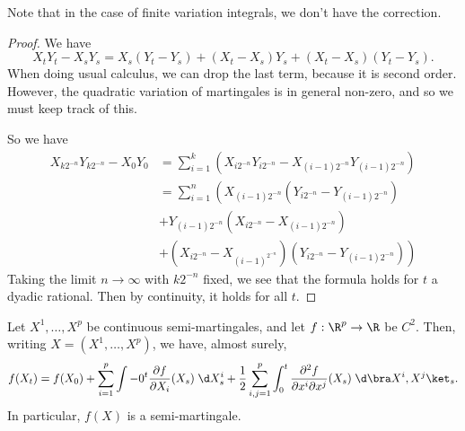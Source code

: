 \documentclass[a4paper]{article}
\begin{document}
Note that in the case of finite variation integrals, we don't have the correction.
\begin{proof}
  We have
  \[
    X_t Y_t - X_s Y_s = X_s (Y_t - Y_s) + (X_t - X_s) Y_s + (X_t - X_s)(Y_t - Y_s).
  \]
  When doing usual calculus, we can drop the last term, because it is second order. However, the quadratic variation of martingales is in general non-zero, and so we must keep track of this.

  So we have
  \begin{align*}
    X_{k2^{-n}} Y_{k2^{-n}} - X_0 Y_0 &= \sum_{i = 1}^k (X_{i2^{-n}} Y_{i2^{-n}} - X_{(i - 1)2^{-n}}Y_{(i - 1)2^{-n}})\\
  &= \sum_{i = 1}^n \left( X_{(i - 1)2^{-n}} (Y_{i2^{-n}} - Y_{(i - 1)2^{-n}})\right.\\
  &+ Y_{(i - 1)2^{-n}}(X_{i 2^{-n}} - X_{(i - 1)2^{-n}}) \\
  & \left.+ (X_{i2^{-n}} - X_{(i - 1)^{2^{-n}}})(Y_{i2^{-n}} - Y_{(i - 1)2^{-n}})\right)
  \end{align*}
  Taking the limit $n \to \infty$ with $k2^{-n}$ fixed, we see that the formula holds for $t$ a dyadic rational. Then by continuity, it holds for all $t$.
\end{proof}

\begin{thm}[It\^o's formula]
  Let $X^1, \ldots, X^p$ be continuous semi-martingales, and let $f: \R^p \to \R$ be $C^2$. Then, writing $X = (X^1, \ldots, X^p)$, we have, almost surely,
  \[
    f(X_t) = f(X_0) + \sum_{i = 1}^p \int-0^t \frac{\partial f}{\partial X_i}(X_s)\;\d X_s^i + \frac{1}{2} \sum_{i, j = 1}^p \int_0^t \frac{\partial^2 f}{\partial x^i \partial x^j} (X_s) \;\d \bra X^i, X^j\ket_s.
  \]
  In particular, $f(X)$ is a semi-martingale.
\end{thm}
\end{document}
